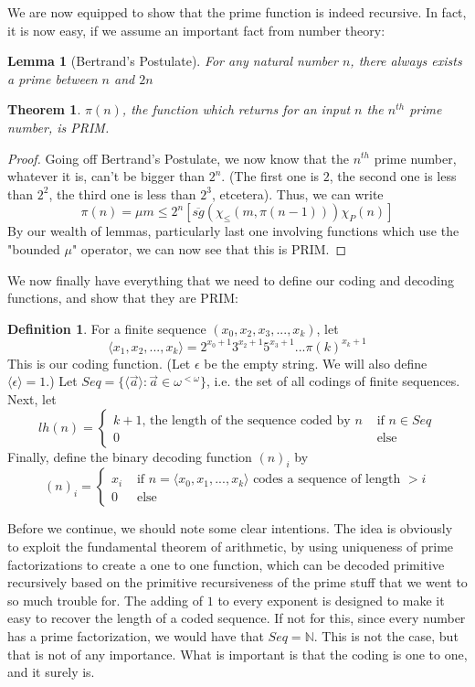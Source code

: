 \documentclass{article}
\theoremstyle{definition}
\newtheorem{definition}{Definition}[section]
\theoremstyle{plain}
\theoremstyle{theorem}
\newtheorem{lemma}{Lemma}[section]
\newtheorem{theorem}{Theorem}[section]
\begin{document}
We are now equipped to show that the prime function is indeed recursive. In fact, it is now easy, if we assume an important fact from number theory:
\begin{lemma}[Bertrand's Postulate]
    For any natural number $n$, there always exists a prime between $n$ and $2n$
\end{lemma}
\begin{theorem}
    $\pi(n)$, the function which returns for an input $n$ the $n^{th}$ prime number, is PRIM.
\end{theorem}
\begin{proof}
    Going off Bertrand's Postulate, we now know that the $n^{th}$ prime number, whatever it is, can't be bigger than $2^n$. (The first one is $2$, the second one is less than $2^2$, the third one is less than $2^3$, etcetera). Thus, we can write
    \[ \pi(n) = \mu m \leq 2^n [\overline{sg}(\chi_{\leq}(m,\pi(n-1)))\chi_P(n) ] \]
    By our wealth of lemmas, particularly last one involving functions which use the "bounded $\mu$" operator, we can now see that this is PRIM. 
\end{proof}
We now finally have everything that we need to define our coding and decoding functions, and show that they are PRIM:
\begin{definition}
    For a finite sequence $(x_0,x_2,x_3,...,x_k)$, let 
    \[\langle x_1,x_2,...,x_k \rangle = 2^{x_0+1}3^{x_2+1}5^{x_3+1}...\pi(k)^{x_k+1} \] 
    This is our coding function. (Let $\epsilon$ be the empty string. We will also define $\langle \epsilon \rangle = 1$.) Let $Seq = \{\langle \vec{a} \rangle: \vec{a} \in \omega^{<\omega}\}$, i.e. the set of all codings of finite sequences. Next, let
    \[lh(n) = \begin{cases}
                k+1\textrm{, the length of the sequence coded by $n$} & \textrm{ if $n \in Seq$} \\
                0 & \textrm{ else}
              \end{cases} \]
    Finally, define the binary decoding function $(n)_i$ by
    \[ (n)_i = \begin{cases}
                  x_i & \textrm{ if $n = \langle x_0,x_1,...,x_k \rangle$ codes a sequence of length $> i$} \\
                  0 & \textrm{ else}
               \end{cases}\]
\end{definition}
Before we continue, we should note some clear intentions. The idea is obviously to exploit the fundamental theorem of arithmetic, by using uniqueness of prime factorizations to create a one to one function, which can be decoded primitive recursively based on the primitive recursiveness of the prime stuff that we went to so much trouble for. The adding of $1$ to every exponent is designed to make it easy to recover the length of a coded sequence. If not for this, since every number has a prime factorization, we would have that $Seq = \mathbb{N}$. This is not the case, but that is not of any importance. What is important is that the coding is one to one, and it surely is.
\end{document}

